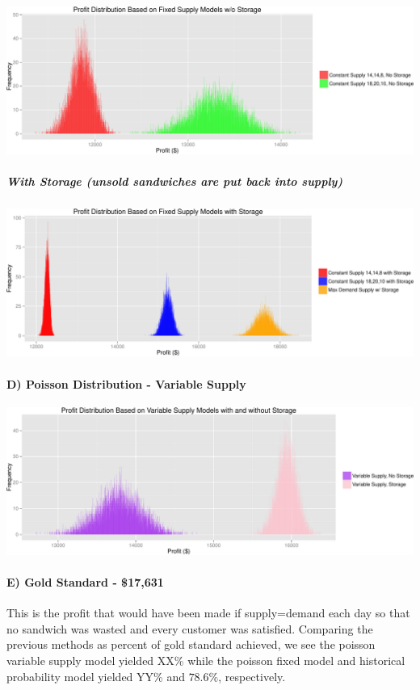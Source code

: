 \documentclass[]{article}
\begin{document}
\includegraphics{./IS606_Sandwich_files/figure-latex/unnamed-chunk-4.pdf}

\subparagraph{With Storage (unsold sandwiches are put back into
supply)}\label{with-storage-unsold-sandwiches-are-put-back-into-supply}

\includegraphics{./IS606_Sandwich_files/figure-latex/unnamed-chunk-5.pdf}

\paragraph{D) Poisson Distribution - Variable
Supply}\label{d-poisson-distribution---variable-supply}

\includegraphics{./IS606_Sandwich_files/figure-latex/unnamed-chunk-6.pdf}

\paragraph{E) Gold Standard - \$17,631}\label{e-gold-standard---17631}

This is the profit that would have been made if supply=demand each day
so that no sandwich was wasted and every customer was satisfied.
Comparing the previous methods as percent of gold standard achieved, we
see the poisson variable supply model yielded XX\% while the poisson
fixed model and historical probability model yielded YY\% and $78.6\%$,
respectively.
\end{document}
